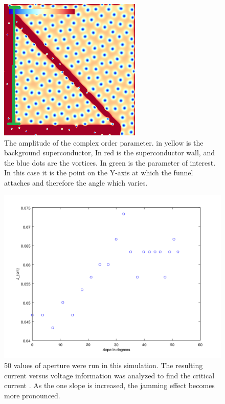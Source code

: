 \begin{figure}[htbp]
\begin{center}
\includegraphics[scale=.50]{oneSidedY.png}
\caption{ The amplitude of the complex order parameter. in yellow is the background superconductor, In red is the superconductor wall, and the blue dots are the vortices. In green is the parameter of interest. In this case it is the point on the Y-axis at which the funnel attaches and therefore the angle which varies.}
\label{oneSidedY}
\end{center}
\end{figure}

\begin{figure}[htbp]
\begin{center}
\includegraphics[scale=.50]{oneside-angle-Scan.png}
\caption{ 50 values of aperture were run in this simulation. The resulting current versus voltage information was analyzed to find the critical current . As the one slope is increased, the jamming effect becomes more pronounced. }
\label{normalYscan}
\end{center}
\end{figure}

